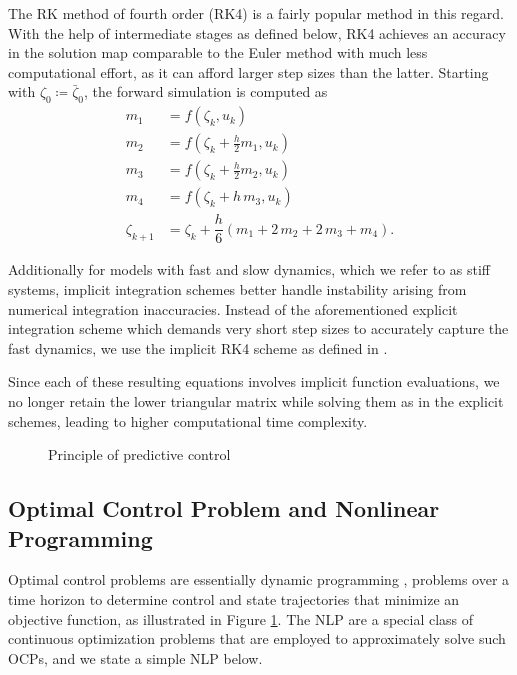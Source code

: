 \par The \ac{RK} method of fourth order (\ac{RK}4) \cite[p. 168]{gros_numerical_2022} is a fairly popular method in this regard. With the help of intermediate stages as defined below, \ac{RK}4 achieves an accuracy in the solution map comparable to the Euler method with much less computational effort, as it can afford larger step sizes than the latter. 
Starting with $\zeta_{0} \coloneq \bar{\zeta}_0$, the forward simulation is computed as
\begin{subequations}
\begin{align}
    m_1 &= f(\zeta_{k}, u_k)\\
    m_2 & = f(\zeta_{k} + \frac{h}{2} m_1, u_k)\\
    m_3 & = f(\zeta_{k} + \frac{h}{2} m_2, u_k)\\
    m_4 & = f(\zeta_{k} + h\,m_3, u_k)\\
    \zeta_{k+1} &= \zeta_{k} + \dfrac{h}{6}(m_1 + 2\,m_2 + 2\,m_3 + m_4).
\end{align}
\end{subequations}
\par Additionally for models with fast and slow dynamics, which we refer to as stiff systems, implicit integration schemes better handle instability arising from numerical integration inaccuracies. Instead of the aforementioned explicit integration scheme which demands very short step sizes to accurately capture the fast dynamics, we use the implicit \ac{RK}4 scheme as defined in  \cite[p. 172]{gros_numerical_2022}.

\par Since each of these resulting equations involves implicit function evaluations, we no longer retain the lower triangular matrix while solving them as in the explicit schemes, leading to higher computational time complexity.

\begin{figure}[htbp]
	\begin{center}
        \def\svgwidth{0.9\textwidth}
        
        \caption{Principle of predictive control}
        \label{fig_ocp}
	\end{center}
\end{figure}

\subsection{Optimal Control Problem and Nonlinear Programming}
\par Optimal control problems are essentially dynamic programming \cite[Ch. 8]{gros_numerical_2022}, \cite[p. 89]{rawlings_james_model_2020} problems over a time horizon to determine control and state trajectories that minimize an objective
function, as illustrated in Figure \ref{fig_ocp}. The \ac{NLP} \cite[p. 38]{gros_numerical_2022} are a special class of continuous optimization problems that are employed to approximately solve such \ac{OCP}s, and we state a simple \ac{NLP} below.

